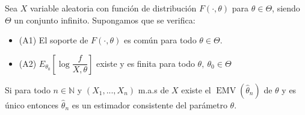 \documentclass[openany]{book}
\begin{document}
\begin{theorem}
    Sea $ X $ variable aleatoria con función de distribución $ F(\cdot ,\theta) $ para $ \theta \in \Theta $, siendo $ \Theta $ un conjunto infinito. Supongamos que se verifica:
    \begin{itemize}
        \item (A1) El soporte de $ F(\cdot ,\theta) $ es común para todo $ \theta \in \Theta $.
        \item (A2) $ E_{\theta_0}\left[\log{\dfrac{f}{X,\theta}}\right] $ existe y es finita para todo $ \theta,\ \theta_0 \in \Theta$
        
    \end{itemize}
    Si para todo $ n \in \mathbb{N} $ y $ (X_1,...,X_n) $ m.a.s de $ X $ existe el $ \operatorname{EMV}(\hat{\theta}_{n}) $ de $ \theta $ y es único entonces $ \hat{\theta}_{n} $ es un estimador consistente del parámetro $ \theta $.
\end{theorem}
\end{document}
